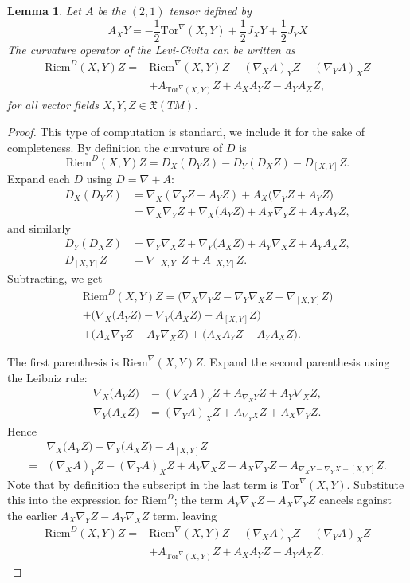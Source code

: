 \documentclass[11pt]{article}
\numberwithin{equation}{section}
\newtheorem{lemma}[theorem]{Lemma}
\newcommand{\Riem}{\mathrm{Riem}}
\newcommand{\Tor}{\mathrm{Tor}}
\begin{document}
\begin{lemma}\label{Riemann in terms of Hlad}
Let $A$ be the $(2,1)$ tensor defined by
\[
A_X Y=-\frac{1}{2} \Tor^\nabla (X,Y)+\frac{1}{2} J_XY+\frac{1}{2} J_Y X
\]
The curvature operator of the Levi-Civita can be written as 
\begin{align*}
\Riem^{D}(X,Y)Z =&\Riem^{\nabla}(X,Y)Z
+(\nabla_XA)_Y Z-(\nabla_YA)_X Z \\
& + A_{\Tor^{\nabla}(X,Y)} Z
+ A_X A_Y Z - A_Y A_X Z,
\end{align*}
for all vector fields $X,Y,Z \in \mathfrak{X}(TM)$.
\end{lemma}

\begin{proof}
This type of computation is standard, we include it for the sake of completeness. By definition the curvature of $D$ is
\[
\Riem^{D}(X,Y)Z
= D_X(D_YZ)-D_Y(D_XZ)-D_{[X,Y]}Z.
\]
Expand each $D$ using $D=\nabla + A$:
\begin{align*}
D_X(D_YZ)
&= \nabla_X(\nabla_YZ + A_Y Z) + A_X\big(\nabla_YZ + A_Y Z\big) \\
&= \nabla_X\nabla_YZ + \nabla_X\big(A_Y Z\big) + A_X\nabla_YZ + A_X A_Y Z,
\end{align*}
and similarly
\begin{align*}
D_Y(D_XZ)
&= \nabla_Y\nabla_XZ + \nabla_Y\big(A_X Z\big) + A_Y \nabla_XZ + A_Y A_X Z,\\
D_{[X,Y]}Z
&= \nabla_{[X,Y]}Z + A_{[X,Y]} Z.
\end{align*}
Subtracting, we get
\begin{multline*}
\Riem^{D}(X,Y)Z
= \big(\nabla_X\nabla_YZ - \nabla_Y\nabla_XZ - \nabla_{[X,Y]}Z\big) \\
+ \big(\nabla_X\big(A_Y Z\big)-\nabla_Y\big(A_X Z\big)-A_{[X,Y]} Z\big) \\
+ \big(A_X \nabla_YZ - A_Y \nabla_XZ\big)
+ \big(A_X A_Y Z - A_Y A_X Z\big).
\end{multline*}

The first parenthesis is $\Riem^{\nabla}(X,Y)Z$. Expand the second parenthesis using the Leibniz rule:
\begin{align*}
\nabla_X\big(A_Y Z\big)
&= (\nabla_XA)_Y  Z + A_{\nabla_X Y}Z +A_Y \nabla_XZ,\\
\nabla_Y\big(A_X Z\big)
&= (\nabla_YA)_X  Z + A_{\nabla_Y X}Z +A_X \nabla_YZ.
\end{align*}
Hence
\begin{align*}
& \nabla_X\big(A_Y Z\big)-\nabla_Y\big(A_X Z\big)-A_{[X,Y]} Z \\
=&  (\nabla_XA)_Y  Z - (\nabla_YA)_X  Z
+ A_Y \nabla_XZ - A_X \nabla_YZ+A_{\nabla_X Y-\nabla_Y X-[X,Y]}Z.
\end{align*}
Note that by definition the subscript in the last term is $\Tor^{\nabla}(X,Y)$. Substitute this into the expression for $\Riem^D$; the term $A_Y \nabla_XZ - A_X\nabla_YZ$ cancels against the earlier $A_X \nabla_YZ - A_Y \nabla_XZ$ term, leaving
\begin{align*}
\Riem^{D}(X,Y)Z =&\Riem^{\nabla}(X,Y)Z
+(\nabla_XA)_Y Z-(\nabla_YA)_X Z \\
& + A_{\Tor^{\nabla}(X,Y)} Z
+ A_X A_Y Z - A_Y A_X Z.
\end{align*}
\end{proof}
\end{document}

